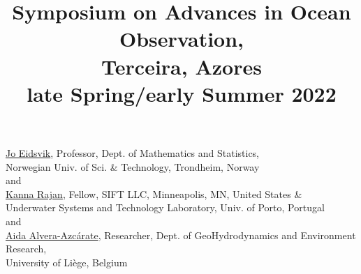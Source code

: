 \documentclass[10pt,letterpaper]{article}
\title{Symposium on Advances in Ocean Observation,\\
  Terceira, Azores \\ \large{\textbf{late Spring/early Summer 2022}}}
\date{}
\begin{document}
\maketitle{}

\vspace{-1.75cm}
\begin{center}
  \href{https://www.ntnu.edu/employees/jo.eidsvik}{\textsf{Jo Eidsvik}},
  Professor, Dept. of Mathematics and Statistics, \\Norwegian Univ. of
  Sci. \& Technology, Trondheim, Norway\\
  and\\
  \href{https://kanna.rajan.systems}{\textsf{Kanna Rajan}},
  Fellow, SIFT LLC, Minneapolis, MN, United States \& \\Underwater Systems and Technology
  Laboratory, Univ. of Porto, Portugal\\
  and\\
   \href{http://modb.oce.ulg.ac.be/mediawiki/index.php/User:Aida}{\textsf{Aida Alvera-Azc\'{a}rate}},
  Researcher, Dept. of GeoHydrodynamics and Environment Research,\\
  University of Li\`{e}ge, Belgium\\
\end{center}





\newpage


\renewcommand{\thepage}{}
\end{document}

